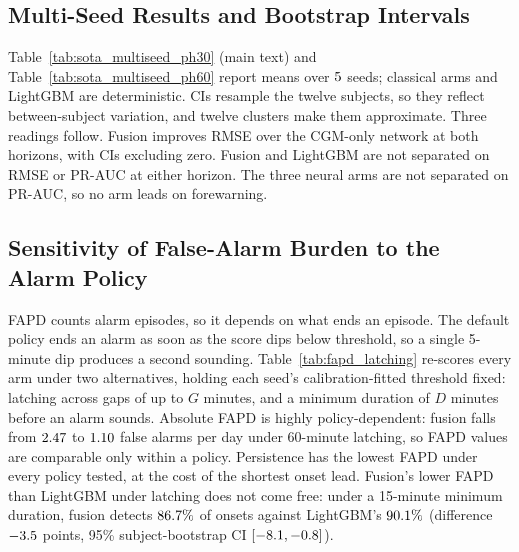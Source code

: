 \clearpage
\subsection{Multi-Seed Results and Bootstrap Intervals}
\label{sec:appendix_multiseed}





Table~\ref{tab:sota_multiseed_ph30} (main text) and
Table~\ref{tab:sota_multiseed_ph60} report means over $5$ seeds;
classical arms and LightGBM are deterministic. CIs resample the twelve subjects,
so they reflect between-subject variation, and twelve clusters make them
approximate. Three readings follow. Fusion improves RMSE over the CGM-only
network at both horizons, with CIs excluding zero. Fusion and LightGBM are not
separated on RMSE or PR-AUC at either horizon. The three neural arms are not
separated on PR-AUC, so no arm leads on forewarning.

\subsection{Sensitivity of False-Alarm Burden to the Alarm Policy}
\label{sec:appendix_latching}



FAPD counts alarm episodes, so it depends on what ends an episode. The default
policy ends an alarm as soon as the score dips below threshold, so a single
5-minute dip produces a second sounding. Table~\ref{tab:fapd_latching} re-scores
every arm under two alternatives, holding each seed's calibration-fitted
threshold fixed: latching across gaps of up to $G$ minutes, and a minimum
duration of $D$ minutes before an alarm sounds. Absolute FAPD is highly
policy-dependent: fusion falls from $2.47$ to
$1.10$ false alarms per day under 60-minute latching, so
FAPD values are comparable only within a policy. Persistence has the lowest FAPD
under every policy tested, at the cost of the shortest onset lead. Fusion's lower
FAPD than LightGBM under latching does not come free: under a 15-minute minimum
duration, fusion detects $86.7\%$ of onsets against
LightGBM's $90.1\%$ (difference $-3.5$
points, 95\% subject-bootstrap CI $[-8.1,
-0.8]$).

